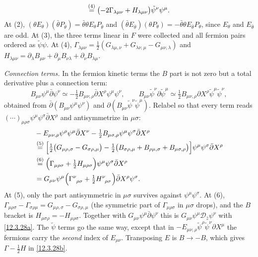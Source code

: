 \begin{tcolorbox}[breakable]
\begin{remark}
\begin{align*}
			\overset{(4)}{=} \bigl(-2\Gamma_{\lambda\mu\nu}+H_{\lambda\mu\nu}\bigr)\tilde\psi^{\nu}\psi^{\mu} .
		\end{align*}
		At (2), $(\theta E_{\theta})(\bar\theta P_{\bar\theta})=\bar\theta\theta E_{\theta}P_{\bar\theta}$ and $(\bar\theta E_{\bar\theta})(\theta P_{\theta})=-\bar\theta\theta E_{\bar\theta}P_{\theta}$, since $E_{\theta}$ and $E_{\bar\theta}$ are odd. At (3), the three terms linear in $F$ were collected and all fermion pairs ordered as $\tilde\psi\psi$. At (4), $\Gamma_{\lambda\mu\nu}=\frac12(G_{\lambda\mu,\nu}+G_{\lambda\nu,\mu}-G_{\mu\nu,\lambda})$ and $H_{\lambda\mu\nu}=\partial_{\lambda}B_{\mu\nu}+\partial_{\mu}B_{\nu\lambda}+\partial_{\nu}B_{\lambda\mu}$.

		\emph{Connection terms.} In the fermion kinetic terms the $B$ part is not zero but a total derivative plus a connection term:
		\[
		B_{\mu\nu}\psi^{\mu}\bar\partial\psi^{\nu}\simeq-\tfrac12B_{\mu\nu,\rho}\bar\partial X^{\rho}\psi^{\mu}\psi^{\nu},\qquad
		B_{\mu\nu}\tilde\psi^{\nu}\partial\tilde\psi^{\mu}\simeq\tfrac12B_{\mu\nu,\rho}\partial X^{\rho}\tilde\psi^{\mu}\tilde\psi^{\nu},
		\]
		obtained from $\bar\partial(B_{\mu\nu}\psi^{\mu}\psi^{\nu})$ and $\partial(B_{\mu\nu}\tilde\psi^{\nu}\tilde\psi^{\mu})$. Relabel so that every term reads $(\cdots)_{\mu\rho\sigma}\psi^{\mu}\psi^{\sigma}\bar\partial X^{\rho}$ and antisymmetrize in $\mu\sigma$:
		\begin{align*}
			&-E_{\mu\nu,\rho}\psi^{\rho}\psi^{\mu}\bar\partial X^{\nu}-\tfrac12B_{\mu\sigma,\rho}\psi^{\mu}\psi^{\sigma}\bar\partial X^{\rho}\\
			&\eqs{5} \Bigl[\tfrac12\bigl(G_{\mu\rho,\sigma}-G_{\sigma\rho,\mu}\bigr)-\tfrac12\bigl(B_{\sigma\rho,\mu}+B_{\rho\mu,\sigma}+B_{\mu\sigma,\rho}\bigr)\Bigr]\psi^{\mu}\psi^{\sigma}\bar\partial X^{\rho}\\
			&\eqs{6} \Bigl(\Gamma_{\mu\rho\sigma}+\tfrac12H_{\mu\rho\sigma}\Bigr)\psi^{\mu}\psi^{\sigma}\bar\partial X^{\rho}\\
			&=G_{\mu\nu}\psi^{\mu}\Bigl(\Gamma\indices{^\nu_\rho_\sigma}+\tfrac12H\indices{^\nu_\rho_\sigma}\Bigr)\bar\partial X^{\rho}\psi^{\sigma} .
		\end{align*}
		At (5), only the part antisymmetric in $\mu\sigma$ survives against $\psi^{\mu}\psi^{\sigma}$. At (6), $\Gamma_{\mu\rho\sigma}-\Gamma_{\sigma\rho\mu}=G_{\mu\rho,\sigma}-G_{\sigma\rho,\mu}$ (the symmetric part of $\Gamma_{\mu\rho\sigma}$ in $\mu\sigma$ drops), and the $B$ bracket is $H_{\mu\sigma\rho}=-H_{\mu\rho\sigma}$. Together with $G_{\mu\nu}\psi^{\mu}\bar\partial\psi^{\nu}$ this is $G_{\mu\nu}\psi^{\mu}\mathscr D_{\bar z}\psi^{\nu}$ with \eqref{12.3.28a}. The $\tilde\psi$ terms go the same way, except that in $-E_{\mu\nu,\rho}\tilde\psi^{\rho}\tilde\psi^{\nu}\partial X^{\mu}$ the fermions carry the \emph{second} index of $E_{\mu\nu}$. Transposing $E$ is $B\to-B$, which gives $\Gamma-\frac12H$ in \eqref{12.3.28b}.


\end{remark}
\end{tcolorbox}
